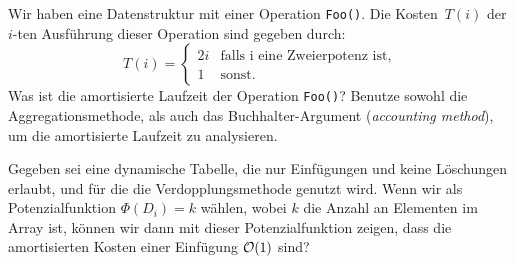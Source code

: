 \documentclass{uebung_cs}
\begin{document}
\begin{aufgabe}
	Wir haben eine Datenstruktur mit einer Operation \texttt{Foo()}. Die Kosten~$T(i)$ der $i$-ten Ausführung dieser Operation sind gegeben durch: 
	\[T(i) = \begin{cases} 2i & \text{falls i eine Zweierpotenz ist}, \\ 1 & \text{sonst}. \end{cases}\] 
	Was ist die amortisierte Laufzeit der Operation \texttt{Foo()}? Benutze sowohl die Aggregationsmethode, als auch das Buchhalter-Argument (\textit{accounting method}), um die amortisierte Laufzeit zu analysieren.
\end{aufgabe}    

\begin{aufgabe}
	Gegeben sei eine dynamische Tabelle, die nur Einfügungen und keine Löschungen erlaubt, und für die die Verdopplungsmethode genutzt wird. Wenn wir als Potenzialfunktion $\Phi(D_i) = k$ wählen, wobei $k$ die Anzahl an Elementen im Array ist, können wir dann mit dieser Potenzialfunktion zeigen, dass die amortisierten Kosten einer Einfügung $\mathcal{O}(1)$ sind?
\end{aufgabe}
\end{document}
